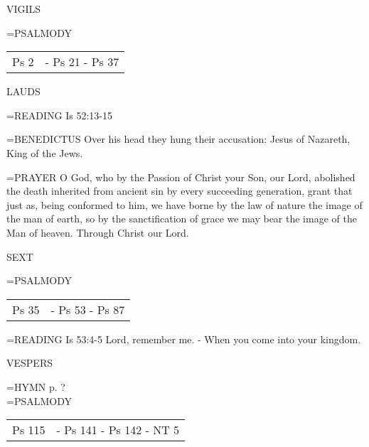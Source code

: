 \begin{flushleft}\normalsize VIGILS\\\end{flushleft}
\hangindent=\parindent \small{PSALMODY}
\begin{center}
\begin{tabular}{ l l }
Ps 2 &  - Ps 21 - Ps 37\\
\end{tabular}
\end{center}		

\begin{flushleft}\normalsize LAUDS\\\end{flushleft}
\hangindent=\parindent \small{READING}    Is 52:13-15 \textbf{   \\}

\hangindent=\parindent \small{BENEDICTUS 	Over his head they hung their accusation: Jesus of Nazareth, King of the Jews.\\}

\hangindent=\parindent \small{PRAYER 	O God, who by the Passion of Christ your Son, our Lord, abolished the death inherited from ancient sin by every succeeding generation, grant that just as, being conformed to him, we have borne by the law of nature the image of the man of earth, so by the sanctification of grace we may bear the image of the Man of heaven. Through Christ our Lord.}

\begin{flushleft}\normalsize SEXT\\\end{flushleft}
\hangindent=\parindent \small{PSALMODY}
\begin{center}
\begin{tabular}{ l l }
Ps 35 &  - Ps 53 - Ps 87\\
\end{tabular}
\end{center}		

\hangindent=\parindent \small{READING}    Is 53:4-5 \textbf{   }
Lord, remember me.
- When you come into your kingdom.

\begin{flushleft}\normalsize VESPERS\\\end{flushleft}
\hangindent=\parindent \small{\uppercase{HYMN} p.  ?\\}
\hangindent=\parindent \small{PSALMODY}
\begin{center}
\begin{tabular}{ l l }
Ps 115 &  - Ps 141 - Ps 142 - NT 5\\
\end{tabular}
\end{center}		

